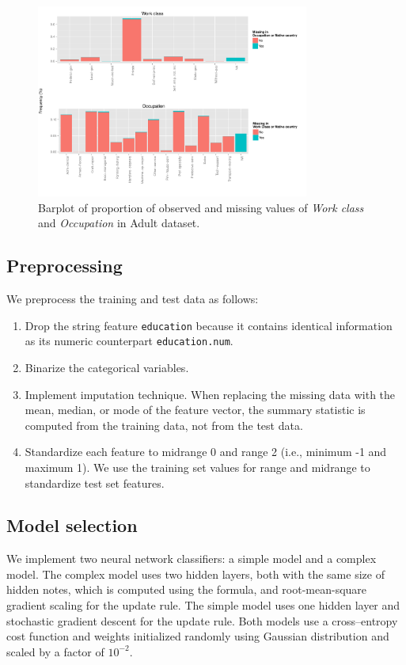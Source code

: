 \documentclass[10pt,twocolumn,letterpaper]{article}
\begin{document}
\begin{figure}[htbp] 
   \centering
   \includegraphics[width=0.8\textwidth]{./figure/barplot-missing.pdf}
   \caption{Barplot of proportion of observed and missing values of \textit{Work class} and \textit{Occupation} in Adult dataset.}
   \label{fig:barplot-missing}
\end{figure}

\subsection{Preprocessing}

We preprocess the training and test data as follows:

\begin{enumerate}
\item Drop the string feature \texttt{education} because it contains identical information as its numeric counterpart \texttt{education.num}.
\item Binarize the categorical variables.
\item Implement imputation technique. When replacing the missing data with the mean, median, or mode of
    the feature vector, the summary statistic is computed from the training data, not from the test data.
\item Standardize each feature to midrange 0 and range 2 (i.e., minimum -1 and maximum 1). We use the training set values for range and midrange to standardize test set features.
\end{enumerate}

\subsection{Model selection}

We implement two neural network classifiers: a simple model and a complex model. The complex model uses two hidden layers, both with the same size of hidden notes, which is computed using the formula, and root-mean-square gradient scaling for the update rule. The simple model uses one hidden layer and stochastic gradient descent for the update rule. Both models use a cross--entropy cost function and weights initialized randomly using Gaussian distribution and scaled by a factor of $10^{-2}$. 
\end{document}
